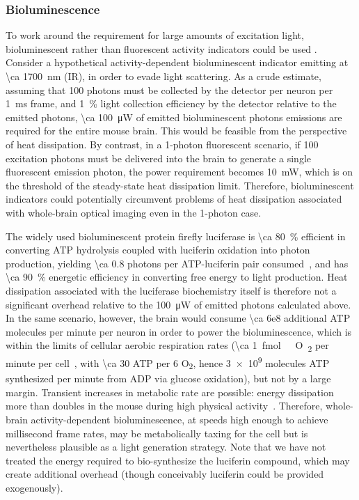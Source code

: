 \subsubsection{Bioluminescence}
To work around the requirement for large amounts of excitation light, bioluminescent rather than fluorescent activity indicators could be used \cite{naumann2010monitoring}.
Consider a hypothetical activity-dependent bioluminescent indicator emitting at \SI{\ca 1700}{\nano\meter} (IR), in order to evade light scattering.
As a crude estimate, assuming that 100 photons must be collected by the detector per neuron per \SI{1}{\milli\second} frame, and \SI{1}{\percent} light collection efficiency by the detector relative to the emitted photons, \SI{\ca 100}{\micro\watt} of emitted bioluminescent photons emissions are required for the entire mouse brain.
This would be feasible from the perspective of heat dissipation.
By contrast, in a 1-photon fluorescent scenario, if 100 excitation photons must be delivered into the brain to generate a single fluorescent emission photon, the power requirement becomes \SI{10}{\milli\watt}, which is on the threshold of the steady-state heat dissipation limit.
Therefore, bioluminescent indicators could potentially circumvent problems of heat dissipation associated with whole-brain optical imaging even in the 1-photon case.

The widely used bioluminescent protein firefly luciferase is \SI{\ca 80}{\percent} efficient in converting ATP hydrolysis coupled with luciferin oxidation into photon production, yielding \num{\ca 0.8} photons per ATP-luciferin pair consumed~\cite{seliger60}, and has \SI{\ca 90}{\percent} energetic efficiency in converting free energy to light production.
Heat dissipation associated with the luciferase biochemistry itself is therefore not a significant overhead relative to the \SI{100}{\micro\watt} of emitted photons calculated above. 
In the same scenario, however, the brain would consume \num{\ca 6e8} additional ATP molecules per minute per neuron in order to power the bioluminescence, which is within the limits of cellular aerobic respiration rates (\SI{\ca 1}{\femto\mole\ O\textsubscript{2}} per minute per cell~\cite{molter09}, with \num{\ca 30} ATP per 6 O\textsubscript{2}, hence \num{3e9} molecules ATP synthesized per minute from ADP via glucose oxidation), but not by a large margin.
Transient increases in metabolic rate are possible: energy dissipation more than doubles in the mouse during high physical activity~\cite{speakman13}.
Therefore, whole-brain activity-dependent bioluminescence, at speeds high enough to achieve millisecond frame rates, may be metabolically taxing for the cell but is nevertheless plausible as a light generation strategy. Note that we have not treated the energy required to bio-synthesize the luciferin compound, which may create additional overhead (though conceivably luciferin could be provided exogenously).


